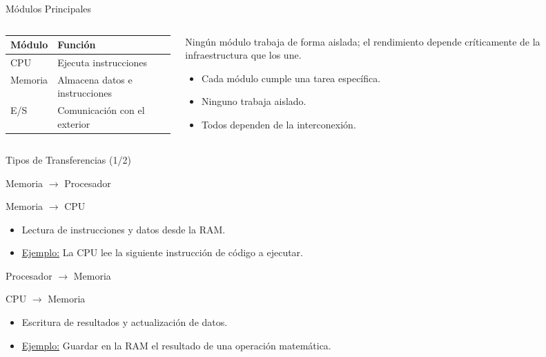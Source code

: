\documentclass[presentation]{beamer}
\begin{document}
\begin{frame}[label={sec:org519cb12}]{Módulos Principales}
\begin{columns}
\begin{column}{0.6\columnwidth}
\begin{center}
\begin{tabular}{ll}
Módulo & Función\\[0pt]
\hline
\alert{CPU} & Ejecuta instrucciones\\[0pt]
\alert{Memoria} & Almacena datos e instrucciones\\[0pt]
\alert{E/S} & Comunicación con el exterior\\[0pt]
\end{tabular}
\end{center}
\end{column}

\begin{column}{0.4\columnwidth}
\begin{center}
Ningún módulo trabaja de forma aislada; el rendimiento depende críticamente de la infraestructura que los une.
\end{center}

\begin{itemize}
\item Cada módulo cumple una tarea específica.
\item Ninguno trabaja aislado.
\item Todos dependen de la interconexión.
\end{itemize}
\end{column}
\end{columns}
\end{frame}

\begin{frame}[allowframebreaks]{Tipos de Transferencias (1/2)}
\begin{block}{Memoria \(\rightarrow\) Procesador}
\begin{center}
\alert{Memoria} \(\longrightarrow\) \alert{CPU}
\end{center}
\begin{itemize}
\item Lectura de instrucciones y datos desde la RAM.
\item \uline{Ejemplo:} La CPU lee la siguiente instrucción de código a ejecutar.
\end{itemize}
\end{block}

\begin{block}{Procesador \(\rightarrow\) Memoria}
\begin{center}
\alert{CPU} \(\longrightarrow\) \alert{Memoria}
\end{center}
\begin{itemize}
\item Escritura de resultados y actualización de datos.
\item \uline{Ejemplo:} Guardar en la RAM el resultado de una operación matemática.
\end{itemize}
\end{block}
\end{frame}
\end{document}
